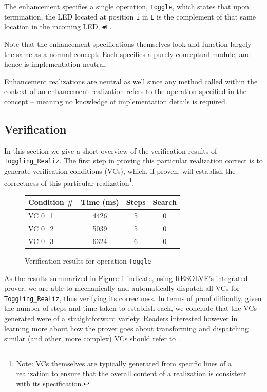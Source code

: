 \documentclass{sig-alternate}
\begin{document}
The enhancement specifies a single operation, \texttt{Toggle}, which states that upon termination, the LED located at position \texttt{i} in \texttt{L} is the complement of that same location in the incoming LED, \texttt{\#L}.

Note that the enhancement specifications themselves look and function largely the same as a normal concept: Each specifies a purely conceptual module, and hence is implementation neutral. 

Enhancement realizations are neutral as well since any method called within the context of an enhancement realization refers to the operation specified in the concept -- meaning no knowledge of implementation details is required.

\subsection{Verification}

In this section we give a short overview of the verification results of \texttt{Toggling\_Realiz}. The first step in proving this particular realization correct is to generate verification conditions (VCs), which, if proven, will establish the correctness of this particular realization\footnote{Note: VCs themselves are typically generated from specific lines of a realization to ensure that the overall content of a realization is consistent with its specification.}.

\begin{figure}[!htb]
\centering
\begin{tabular}{lccc}
	\toprule
	Condition \# & Time (ms)	& Steps	& Search \\
	\midrule
	VC 0\_1	& 4426	& 5	& 0	\\
	VC 0\_2	& 5039	& 5	& 0	\\
	VC 0\_3	& 6324	& 6	& 0	\\
	\bottomrule
\end{tabular}
\caption{Verification results for operation \texttt{Toggle}}
\label{fig:results}
\end{figure}

As the results summarized in Figure \ref{fig:results} indicate, using RESOLVE's integrated prover, we are able to mechanically and automatically dispatch all VCs for \texttt{Toggling\_Realiz}, thus verifying its correctness. In terms of proof difficulty, given the number of steps and time taken to establish each, we conclude that the VCs generated were of a straightforward variety. Readers interested however in learning more about how the prover goes about transforming and dispatching similar (and other, more complex) VCs should refer to \cite{smith:2013}.
\end{document}
